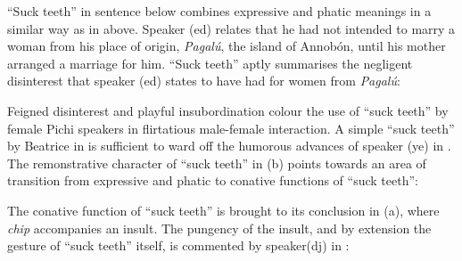 “Suck teeth” in sentence  below combines expressive and phatic meanings in a similar way as in  above. Speaker (ed) relates that he had not intended to marry a woman from his place of origin, \textit{Pagalú}, the island of Annobón, until his mother arranged a marriage for him. “Suck teeth” aptly summarises the negligent disinterest that speaker (ed) states to have had for women from \textit{Pagalú}: 


\ea%
    \label{ex:key:1667}
\z\z

Feigned disinterest and playful insubordination colour the use of “suck teeth” by female Pichi speakers in flirtatious male-female interaction. A simple “suck teeth” by Beatrice in  is sufficient to ward off the humorous advances of speaker (ye) in . The remonstrative character of “suck teeth” in (b) points towards an area of transition from expressive and phatic to conative functions of “suck teeth”:


\ea%
    \label{ex:key:1668}
\z\z

The conative function of “suck teeth” is brought to its conclusion in (a), where\textit{ chip} accompanies an insult. The pungency of the insult, and by extension the gesture of “suck teeth” itself, is commented by speaker(dj) in :


